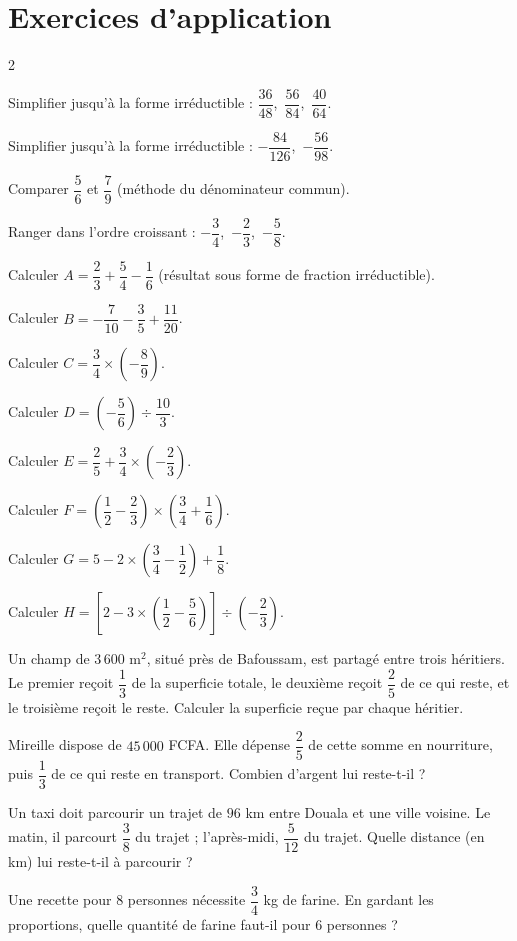 \section{Exercices d'application}
\begin{multicols}{2}

\exo{} Simplifier jusqu'à la forme irréductible : $\dfrac{36}{48}$,\ $\dfrac{56}{84}$,\ $\dfrac{40}{64}$.

\exo{} Simplifier jusqu'à la forme irréductible : $-\dfrac{84}{126}$,\ $-\dfrac{56}{98}$.

\exo{} Comparer $\dfrac56$ et $\dfrac79$ (méthode du dénominateur commun).

\exo{} Ranger dans l'ordre croissant : $-\dfrac34$,\ $-\dfrac23$,\ $-\dfrac58$.

\exo{} Calculer $A=\dfrac23+\dfrac54-\dfrac16$ (résultat sous forme de fraction
irréductible).

\exo{} Calculer $B=-\dfrac7{10}-\dfrac35+\dfrac{11}{20}$.

\exo{} Calculer $C=\dfrac34\times\left(-\dfrac89\right)$.

\exo{} Calculer $D=\left(-\dfrac56\right)\div\dfrac{10}3$.

\exo{} Calculer $E=\dfrac25+\dfrac34\times\left(-\dfrac23\right)$.

\exo{} Calculer $F=\left(\dfrac12-\dfrac23\right)\times\left(\dfrac34+\dfrac16\right)$.

\exo{} Calculer $G=5-2\times\left(\dfrac34-\dfrac12\right)+\dfrac18$.

\exo{} Calculer $H=\left[2-3\times\left(\dfrac12-\dfrac56\right)\right]\div\left(-\dfrac23\right)$.

\exo{} Un champ de $3\,600\text{ m}^2$, situé près de Bafoussam, est partagé entre
trois héritiers. Le premier reçoit $\dfrac13$ de la superficie totale, le deuxième reçoit
$\dfrac25$ de ce qui reste, et le troisième reçoit le reste. Calculer la superficie reçue par
chaque héritier.

\exo{} Mireille dispose de $45\,000$ FCFA. Elle dépense $\dfrac25$ de cette somme en
nourriture, puis $\dfrac13$ de ce qui reste en transport. Combien d'argent lui reste-t-il ?

\exo{} Un taxi doit parcourir un trajet de $96$ km entre Douala et une ville voisine.
Le matin, il parcourt $\dfrac38$ du trajet ; l'après-midi, $\dfrac5{12}$ du trajet. Quelle
distance (en km) lui reste-t-il à parcourir ?

\exo{} Une recette pour $8$ personnes nécessite $\dfrac34$ kg de farine. En gardant
les proportions, quelle quantité de farine faut-il pour $6$ personnes ?

\end{multicols}

